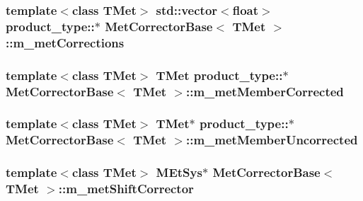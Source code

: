 \label{classMetCorrectorBase_af0c8f314b82074900251d273fbabba12}
\hypertarget{classMetCorrectorBase_a5f393c3c3de785b48c88fdb4068d78ee}{
\subsubsection[{m\_\-metCorrections}]{\setlength{\rightskip}{0pt plus 5cm}template$<$class TMet$>$ std::vector$<$float$>$ product\_\-type::$\ast$ {\bf MetCorrectorBase}$<$ TMet $>$::{\bf m\_\-metCorrections}}}
\label{classMetCorrectorBase_a5f393c3c3de785b48c88fdb4068d78ee}
\hypertarget{classMetCorrectorBase_a12111218c46fcb7d0076b3eb68723c2e}{
\subsubsection[{m\_\-metMemberCorrected}]{\setlength{\rightskip}{0pt plus 5cm}template$<$class TMet$>$ TMet product\_\-type::$\ast$ {\bf MetCorrectorBase}$<$ TMet $>$::{\bf m\_\-metMemberCorrected}}}
\label{classMetCorrectorBase_a12111218c46fcb7d0076b3eb68723c2e}
\hypertarget{classMetCorrectorBase_adad757ee9377e76716ccc0a112e1de20}{
\subsubsection[{m\_\-metMemberUncorrected}]{\setlength{\rightskip}{0pt plus 5cm}template$<$class TMet$>$ TMet$\ast$ product\_\-type::$\ast$ {\bf MetCorrectorBase}$<$ TMet $>$::{\bf m\_\-metMemberUncorrected}}}
\label{classMetCorrectorBase_adad757ee9377e76716ccc0a112e1de20}
\hypertarget{classMetCorrectorBase_a5ca29fccc54b4183b2cf73a4e0183abe}{
\subsubsection[{m\_\-metShiftCorrector}]{\setlength{\rightskip}{0pt plus 5cm}template$<$class TMet$>$ {\bf MEtSys}$\ast$ {\bf MetCorrectorBase}$<$ TMet $>$::{\bf m\_\-metShiftCorrector}}}
